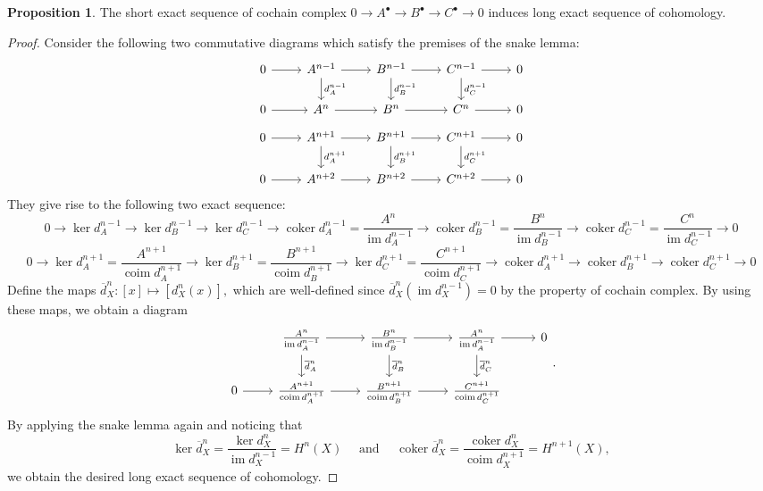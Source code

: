 \documentclass[10pt]{report}
\theoremstyle{definition}
\newtheorem{proposition}{Proposition}
\begin{document}
\begin{proposition}
The short exact sequence of cochain complex $0\to A^\bullet\to B^\bullet\to C^\bullet\to0$ induces long exact sequence of cohomology.
\end{proposition}
\begin{proof}
Consider the following two commutative diagrams which satisfy the premises of the snake lemma:
$$
\begin{tikzcd}
            0 \arrow[r] & A^{n-1} \arrow[r] \arrow[d, "d^{n-1}_A"] & B^{n-1} \arrow[r] \arrow[d, "d^{n-1}_B"] & C^{n-1} \arrow[r] \arrow[d, "d^{n-1}_C"] & 0 \\
0 \arrow[r] & A^n \arrow[r]                            & B^n \arrow[r]                            & C^n                                      \arrow[r] & 0
\end{tikzcd}
$$
$$
\begin{tikzcd}
           0 \arrow[r] & A^{n+1} \arrow[r] \arrow[d, "d^{n+1}_A"] & B^{n+1} \arrow[r] \arrow[d, "d^{n+1}_B"] & C^{n+1} \arrow[r] \arrow[d, "d^{n+1}_C"] & 0 \\
0 \arrow[r] & A^{n+2} \arrow[r]                        & B^{n+2} \arrow[r]                        & C^{n+2}                                 \arrow[r] & 0
\end{tikzcd}
$$
They give rise to the following two exact sequence:
$$
0\to\ker d^{n-1}_A\to\ker d^{n-1}_B\to\ker d^{n-1}_C\to\operatorname{coker}d^{n-1}_A=\frac{A^n}{\operatorname{im}d^{n-1}_A}\to\operatorname{coker}d^{n-1}_B=\frac{B^n}{\operatorname{im}d^{n-1}_B}\to\operatorname{coker}d^{n-1}_C=\frac{C^n}{\operatorname{im}d^{n-1}_C}\to0
$$
$$
0\to\ker d^{n+1}_A=\frac{A^{n+1}}{\operatorname{coim}d^{n+1}_A}\to\ker d^{n+1}_B=\frac{B^{n+1}}{\operatorname{coim}d^{n+1}_B}\to\ker d^{n+1}_C=\frac{C^{n+1}}{\operatorname{coim}d^{n+1}_C}\to\operatorname{coker}d^{n+1}_A\to\operatorname{coker}d^{n+1}_B\to\operatorname{coker}d^{n+1}_C\to0
$$
Define the maps
$\overline{d}^n_X:[x]\mapsto[d^{n}_X(x)],$
which are well-defined since $\overline{d}^n_X(\operatorname{im}d^{n-1}_X)=0$ by the property of cochain complex.
By using these maps, we obtain a diagram
$$
\begin{tikzcd}
            & \frac{A^n}{\operatorname{im}d^{n-1}_A} \arrow[d, "\overline{d}^{n}_A"] \arrow[r] & \frac{B^n}{\operatorname{im}d^{n-1}_B} \arrow[d, "\overline{d}^{n}_B"] \arrow[r] & \frac{A^n}{\operatorname{im}d^{n-1}_A} \arrow[d, "\overline{d}^{n}_C"] \arrow[r] & 0 \\
0 \arrow[r] & \frac{A^{n+1}}{\operatorname{coim}d^{n+1}_A} \arrow[r]                           & \frac{B^{n+1}}{\operatorname{coim}d^{n+1}_B} \arrow[r]                           & \frac{C^{n+1}}{\operatorname{coim}d^{n+1}_C}                                     &
\end{tikzcd}.
$$
By applying the snake lemma again and noticing that
$$
\ker\overline{d}^n_X=\frac{\ker d^n_X}{\operatorname{im}d^{n-1}_X}=H^n(X)\quad\text{ and }\quad\operatorname{coker}\overline{d}^n_X=\frac{\operatorname{coker}d^n_X}{\operatorname{coim}d^{n+1}_X}=H^{n+1}(X),
$$
we obtain the desired long exact sequence of cohomology.
\end{proof}
\end{document}
